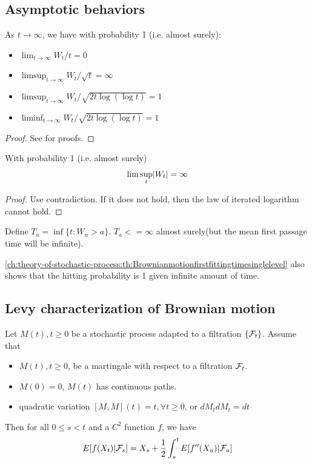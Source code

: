 \begin{refsection}
\subsection{Asymptotic behaviors}
\begin{theorem}\label{ch:theory-of-stochastic-process:th:lawofiteratedlogarithms}
	As $t\to \infty$, we have with probability 1 (i.e. almost surely):
	\begin{itemize}
		\item $\lim_{t\to \infty} W_t/t = 0$
		\item $\limsup_{t\to \infty} W_t/\sqrt{t} = \infty$
		\item $\limsup_{t\to \infty} W_t/\sqrt{2t\log(\log t)} = 1$
		\item $\liminf_{t\to \infty} W_t/\sqrt{2t\log(\log t)} = 1$
	\end{itemize}
\end{theorem}
\begin{proof}
	See \cite{Holmes-Cerfon2015applied} for proofs.	
\end{proof}




\begin{corollary}
	With probability 1 (i.e. almost surely)
	$$\lim \sup_t \abs{W_t} = \infty$$
\end{corollary}
\begin{proof}
	Use contradiction. If it does not hold, then the law of iterated logarithm cannot hold.
\end{proof}


\begin{corollary}
	Define $T_a = \inf\{t:W_n > a\}$. $T_a <= \infty$ almost surely(but the mean first passage time will be infinite).
\end{corollary}

\begin{remark}
	\autoref{ch:theory-of-stochastic-process:th:Brownianmotionfirstfittingtimesinglelevel} also shows that the hitting probability is 1 given infinite amount of time.
\end{remark}


\subsection{Levy characterization of Brownian motion}
\begin{lemma}
	Let $M(t),t\geq 0$ be a stochastic process adapted to a filtration $\{\mathcal{F}_t\}$. Assume that
	\begin{itemize}
		\item $M(t),t\geq 0$, be a martingale with respect to a filtration $\mathcal{F}_t$.
		\item $M(0) = 0$, $M(t)$ has continuous paths.
		\item quadratic variation $[M,M](t) = t,\forall t\geq 0$, or $dM_t dM_t = dt$
	\end{itemize}
	Then for all $0\leq s < t$ and a $C^2$ function $f$, we have
	$$E[f(X_t)|\mathcal{F}_s] = X_s + \frac{1}{2}\int_s^t E[f''(X_u)|\mathcal{F}_u]$$ 	
\end{lemma}



\end{refsection}
